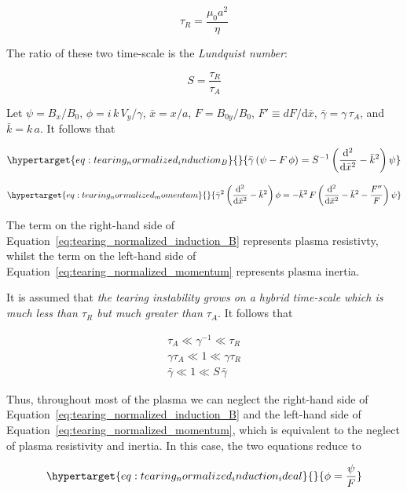 \documentclass[
  notoc %
]{tufte-book}
\begin{document}
\[
\tau_R=\frac{\mu_0 a^2}{\eta}
\]

The ratio of these two time-scale is the \emph{Lundquist number}:

\[
S=\frac{\tau_R}{\tau_A}
\]

Let \(\psi= B_x/B_0\), \(\phi = i\,k\,V_y/\gamma\), \(\bar{x}=x/a\),
\(F=B_{0y}/B_0\), \(F'\equiv dF/\mathrm{d}\bar{x}\),
\(\bar{\gamma} = \gamma\,\tau_A\), and \(\bar{k} = k\,a\). It follows
that

\begin{equation}\protect\hypertarget{eq:tearing_normalized_induction_B}{}{
\bar{\gamma}\,(\psi-F\,\phi) = S^{-1}\left(\frac{\mathrm{d}^2}{\mathrm{d}\bar{x}^2}-\bar{k}^2\right) \psi
}\label{eq:tearing_normalized_induction_B}\end{equation}

\begin{equation}\protect\hypertarget{eq:tearing_normalized_momentum}{}{
\bar{\gamma}^2\left(\frac{\mathrm{d}^2}{\mathrm{d}\bar{x}^2} -\bar{k}^2\right)\phi = -\bar{k}^2\, F \left( \frac{\mathrm{d}^2}{\mathrm{d}\bar{x}^2} -\bar{k}^2 - \frac{F''}{F}\right) \psi
}\label{eq:tearing_normalized_momentum}\end{equation}

The term on the right-hand side of
Equation~\ref{eq:tearing_normalized_induction_B} represents plasma
resistivty, whilst the term on the left-hand side of
Equation~\ref{eq:tearing_normalized_momentum} represents plasma inertia.

It is assumed that \emph{the tearing instability grows on a hybrid
time-scale which is much less than \(\tau_R\) but much greater than
\(\tau_A\)}. It follows that

\[
\begin{aligned}
\tau_A \ll \gamma^{-1} \ll \tau_R \\
\gamma\tau_A \ll 1 \ll \gamma\tau_R \\
\bar{\gamma} \ll 1 \ll S\,\bar{\gamma}
\end{aligned}
\]

Thus, throughout most of the plasma we can neglect the right-hand side
of Equation~\ref{eq:tearing_normalized_induction_B} and the left-hand
side of Equation~\ref{eq:tearing_normalized_momentum}, which is
equivalent to the neglect of plasma resistivity and inertia. In this
case, the two equations reduce to

\begin{equation}\protect\hypertarget{eq:tearing_normalized_induction_ideal}{}{
\phi = \frac{\psi}{F}
}\label{eq:tearing_normalized_induction_ideal}\end{equation}
\end{document}
